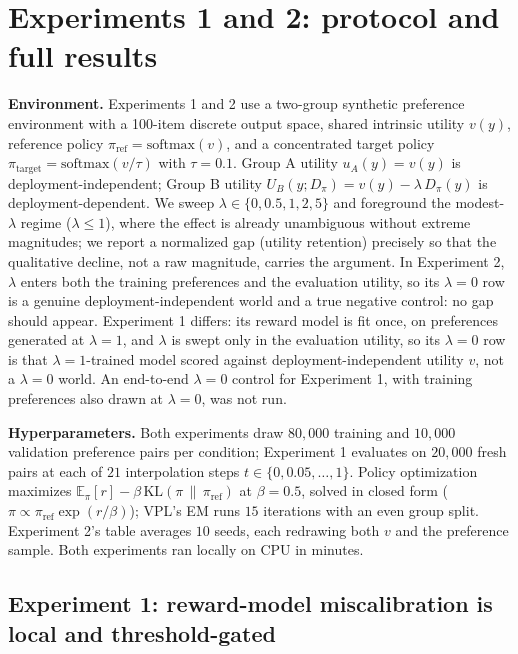 ﻿\documentclass[11pt]{article}
\begin{document}



\clearpage
\appendix

\section{Experiments 1 and 2: protocol and full results}
\label{app:exp12}

\textbf{Environment.} Experiments 1 and 2 use a two-group synthetic preference environment with a 100-item discrete output space, shared intrinsic utility \(v(y)\), reference policy \(\pi_{\text{ref}} = \mathrm{softmax}(v)\), and a concentrated target policy \(\pi_{\text{target}} = \mathrm{softmax}(v/\tau)\) with \(\tau = 0.1\). Group A utility \(u_A(y) = v(y)\) is deployment-independent; Group B utility \(U_B(y; D_\pi) = v(y) - \lambda \, D_\pi(y)\) is deployment-dependent. We sweep \(\lambda \in \{0, 0.5, 1, 2, 5\}\) and foreground the modest-\(\lambda\) regime (\(\lambda \leq 1\)), where the effect is already unambiguous without extreme magnitudes; we report a normalized gap (utility retention) precisely so that the qualitative decline, not a raw magnitude, carries the argument. In Experiment 2, \(\lambda\) enters both the training preferences and the evaluation utility, so its \(\lambda = 0\) row is a genuine deployment-independent world and a true negative control: no gap should appear. Experiment 1 differs: its reward model is fit once, on preferences generated at \(\lambda = 1\), and \(\lambda\) is swept only in the evaluation utility, so its \(\lambda = 0\) row is that \(\lambda = 1\)-trained model scored against deployment-independent utility \(v\), not a \(\lambda = 0\) world. An end-to-end \(\lambda = 0\) control for Experiment 1, with training preferences also drawn at \(\lambda = 0\), was not run.

\textbf{Hyperparameters.} Both experiments draw \(80{,}000\) training and \(10{,}000\) validation preference pairs per condition; Experiment 1 evaluates on \(20{,}000\) fresh pairs at each of \(21\) interpolation steps \(t \in \{0, 0.05, \dots, 1\}\). Policy optimization maximizes \(\mathbb{E}_\pi[r] - \beta\,\mathrm{KL}(\pi \,\|\, \pi_{\text{ref}})\) at \(\beta = 0.5\), solved in closed form (\(\pi \propto \pi_{\text{ref}}\exp(r/\beta)\)); VPL's EM runs \(15\) iterations with an even group split. Experiment 2's table averages \(10\) seeds, each redrawing both \(v\) and the preference sample. Both experiments ran locally on CPU in minutes.

\subsection{Experiment 1: reward-model miscalibration is local and threshold-gated}
\end{document}
